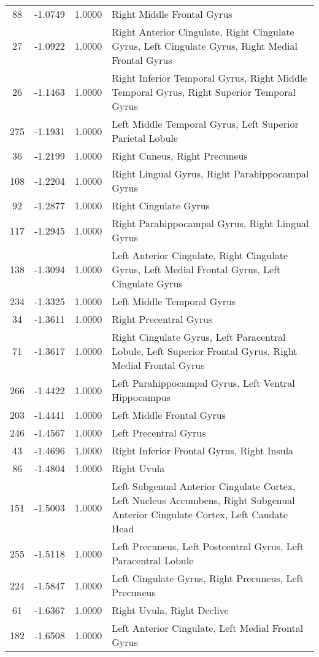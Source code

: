 \documentclass[10pt,letterpaper]{article}\usepackage[]{graphicx}\usepackage[]{color}
\begin{document}
\begin{center}
\begin{longtable}[c]{cccp{4in}}
		88	& -1.0749 & 1.0000 & Right Middle Frontal Gyrus \\
		27	& -1.0922 & 1.0000 & Right Anterior Cingulate, Right Cingulate Gyrus, Left Cingulate Gyrus, Right Medial Frontal Gyrus \\
		26	& -1.1463 & 1.0000 & Right Inferior Temporal Gyrus, Right Middle Temporal Gyrus, Right Superior Temporal Gyrus \\
		275	& -1.1931 & 1.0000 & Left Middle Temporal Gyrus, Left Superior Parietal Lobule \\
		36	& -1.2199 & 1.0000 & Right Cuneus, Right Precuneus \\
		108	& -1.2204 & 1.0000 & Right Lingual Gyrus, Right Parahippocampal Gyrus \\
		92	& -1.2877 & 1.0000 & Right Cingulate Gyrus \\
		117	& -1.2945 & 1.0000 & Right Parahippocampal Gyrus, Right Lingual Gyrus \\
		138	& -1.3094 & 1.0000 & Left Anterior Cingulate, Right Cingulate Gyrus, Left Medial Frontal Gyrus, Left Cingulate Gyrus \\
		234	& -1.3325 & 1.0000 & Left Middle Temporal Gyrus \\
		34	& -1.3611 & 1.0000 & Right Precentral Gyrus \\
		71	& -1.3617 & 1.0000 & Right Cingulate Gyrus, Left Paracentral Lobule, Left Superior Frontal Gyrus, Right Medial Frontal Gyrus \\
		266	& -1.4422 & 1.0000 & Left Parahippocampal Gyrus, Left Ventral Hippocampus \\
		203	& -1.4441 & 1.0000 & Left Middle Frontal Gyrus \\
		246	& -1.4567 & 1.0000 & Left Precentral Gyrus \\
		43	& -1.4696 & 1.0000 & Right Inferior Frontal Gyrus, Right Insula \\
		86	& -1.4804 & 1.0000 & Right Uvula \\
		151	& -1.5003 & 1.0000 & Left Subgenual Anterior Cingulate Cortex, Left Nucleus Accumbens, Right Subgenual Anterior Cingulate Cortex, Left Caudate Head \\
		255	& -1.5118 & 1.0000 & Left Precuneus, Left Postcentral Gyrus, Left Paracentral Lobule \\
		224	& -1.5847 & 1.0000 & Left Cingulate Gyrus, Right Precuneus, Left Precuneus \\
		61	& -1.6367 & 1.0000 & Right Uvula, Right Declive \\
		182	& -1.6508 & 1.0000 & Left Anterior Cingulate, Left Medial Frontal Gyrus \\

\end{longtable}
\end{center}
\end{document}
